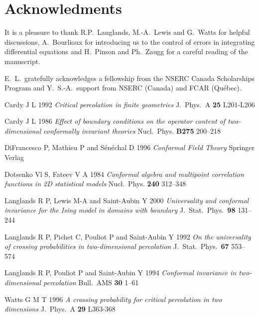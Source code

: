 \documentclass[a4paper,12pt]{article}
\begin{document}
\section*{Acknowledments} 
 
It is a pleasure to thank R.P.\ Langlands, M.-A.\ Lewis 
and G.\ Watts for helpful
discussions, A.\ Bourlioux for introducing us to the control of
errors in integrating differential equations and H.\ Pinson and
Ph.\ Zaugg for a careful reading of the manuscript.
 
E.\ L.\ gratefully acknowledges a fellowship from the NSERC Canada  
Scholarships Program and Y.\ S.-A.\ support 
from NSERC (Canada) and FCAR (Qu\'ebec).  

 
\begin{thebibliography}{1} 
 
 

 Cardy J L 1992 {\em Critical percolation in finite geometries}
J.\ Phys.\ A {\bf 25} L201-L206

 Cardy J L 1986 {\em Effect of boundary conditions on  
the operator content of two-dimensional conformally invariant theories}
Nucl.\ Phys. {\bf B275} 200--218

 DiFrancesco P, Mathieu P and  S\'en\'echal D 1996  
{\em Conformal Field Theory} Springer Verlag

 Dotsenko Vl S, Fateev V A 1984 {\em Conformal algebra
and multipoint correlation functions in 2D statistical models}
Nucl.\ Phys. {\bf 240} 312--348

 Langlands R P, Lewis M-A and Saint-Aubin Y 2000
{\em Universality and conformal invariance for the Ising model in 
domains with boundary} J.\ Stat.\ Phys.\ {\bf 98}  131--244

 Langlands R P, Pichet C, Pouliot P and Saint-Aubin Y 1992
{\em On the universality of crossing probabilities in two-dimensional
percolation} J.\ Stat.\ Phys.\ {\bf 67} 553--574

 Langlands R P, Pouliot P and Saint-Aubin Y 1994
{\em Conformal invariance in two-dimensional percolation} Bull.\ AMS
{\bf 30} 1--61

 Watts G M T 1996 {\em A crossing probability for critical percolation
in two dimensions} J.\ Phys.\ A {\bf 29} L363-368

\end{thebibliography}
\end{document}
